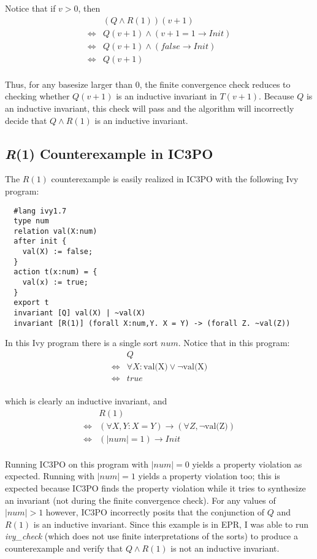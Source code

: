 \documentclass[12pt]{article}
\begin{document}
Notice that if $v>0$, then
\begin{align*}
  &(Q \land R(1))(v+1)\\
  \iff &Q(v+1) \land (v+1=1 \rightarrow Init)\\
  \iff &Q(v+1) \land (false \rightarrow Init)\\
  \iff &Q(v+1)\\
\end{align*}

Thus, for any basesize larger than 0, the finite convergence check reduces to checking whether $Q(v+1)$ is an inductive invariant in $T(v+1)$.  Because $Q$ is an inductive invariant, this check will pass and the algorithm will incorrectly decide that $Q \land R(1)$ is an inductive invariant.

\subsection{\textit{R}(1) Counterexample in IC3PO}
The $R(1)$ counterexample is easily realized in IC3PO with the following Ivy program:

\begin{verbatim}
  #lang ivy1.7
  type num
  relation val(X:num)
  after init {
    val(X) := false;
  }
  action t(x:num) = {
    val(x) := true;
  }
  export t
  invariant [Q] val(X) | ~val(X)
  invariant [R(1)] (forall X:num,Y. X = Y) -> (forall Z. ~val(Z))
\end{verbatim}

In this Ivy program there is a single sort $num$.  Notice that in this program:
\begin{align*}
  &Q\\
  \iff &\forall X: \text{val(X)} \lor \neg\text{val(X)}\\
  \iff &true\\
\end{align*}

which is clearly an inductive invariant, and
\begin{align*}
  &R(1)\\
  \iff &(\forall X,Y: X=Y) \rightarrow (\forall Z, \neg\text{val(Z)})\\
  \iff &(|num|=1) \rightarrow Init\\
\end{align*}

Running IC3PO on this program with $|num|=0$ yields a property violation as expected.  Running with $|num|=1$ yields a property violation too; this is expected because IC3PO finds the property violation while it tries to synthesize an invariant (not during the finite convergence check).  For any values of $|num|>1$ however, IC3PO incorrectly posits that the conjunction of $Q$ and $R(1)$ is an inductive invariant.  Since this example is in EPR, I was able to run \textit{ivy\_check} (which does not use finite interpretations of the sorts) to produce a counterexample and verify that $Q \land R(1)$ is not an inductive invariant.
\end{document}
